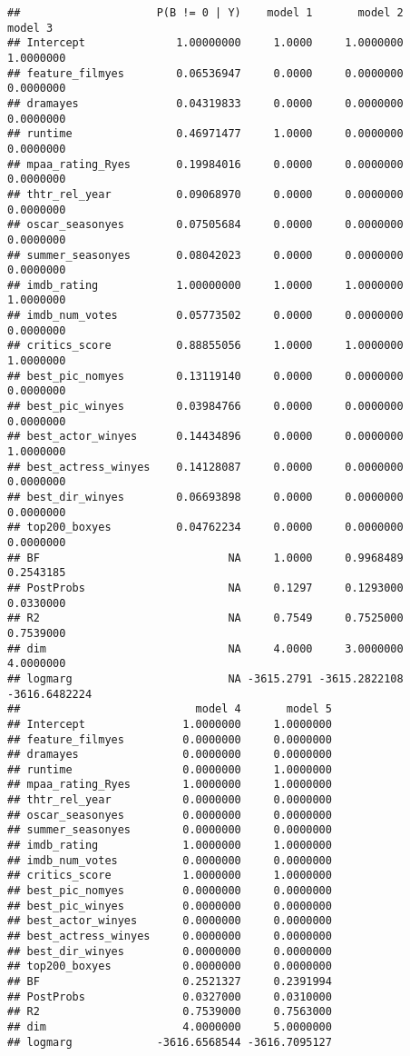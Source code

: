\documentclass[]{article}
\begin{document}
\begin{verbatim}
##                     P(B != 0 | Y)    model 1       model 2       model 3
## Intercept              1.00000000     1.0000     1.0000000     1.0000000
## feature_filmyes        0.06536947     0.0000     0.0000000     0.0000000
## dramayes               0.04319833     0.0000     0.0000000     0.0000000
## runtime                0.46971477     1.0000     0.0000000     0.0000000
## mpaa_rating_Ryes       0.19984016     0.0000     0.0000000     0.0000000
## thtr_rel_year          0.09068970     0.0000     0.0000000     0.0000000
## oscar_seasonyes        0.07505684     0.0000     0.0000000     0.0000000
## summer_seasonyes       0.08042023     0.0000     0.0000000     0.0000000
## imdb_rating            1.00000000     1.0000     1.0000000     1.0000000
## imdb_num_votes         0.05773502     0.0000     0.0000000     0.0000000
## critics_score          0.88855056     1.0000     1.0000000     1.0000000
## best_pic_nomyes        0.13119140     0.0000     0.0000000     0.0000000
## best_pic_winyes        0.03984766     0.0000     0.0000000     0.0000000
## best_actor_winyes      0.14434896     0.0000     0.0000000     1.0000000
## best_actress_winyes    0.14128087     0.0000     0.0000000     0.0000000
## best_dir_winyes        0.06693898     0.0000     0.0000000     0.0000000
## top200_boxyes          0.04762234     0.0000     0.0000000     0.0000000
## BF                             NA     1.0000     0.9968489     0.2543185
## PostProbs                      NA     0.1297     0.1293000     0.0330000
## R2                             NA     0.7549     0.7525000     0.7539000
## dim                            NA     4.0000     3.0000000     4.0000000
## logmarg                        NA -3615.2791 -3615.2822108 -3616.6482224
##                           model 4       model 5
## Intercept               1.0000000     1.0000000
## feature_filmyes         0.0000000     0.0000000
## dramayes                0.0000000     0.0000000
## runtime                 0.0000000     1.0000000
## mpaa_rating_Ryes        1.0000000     1.0000000
## thtr_rel_year           0.0000000     0.0000000
## oscar_seasonyes         0.0000000     0.0000000
## summer_seasonyes        0.0000000     0.0000000
## imdb_rating             1.0000000     1.0000000
## imdb_num_votes          0.0000000     0.0000000
## critics_score           1.0000000     1.0000000
## best_pic_nomyes         0.0000000     0.0000000
## best_pic_winyes         0.0000000     0.0000000
## best_actor_winyes       0.0000000     0.0000000
## best_actress_winyes     0.0000000     0.0000000
## best_dir_winyes         0.0000000     0.0000000
## top200_boxyes           0.0000000     0.0000000
## BF                      0.2521327     0.2391994
## PostProbs               0.0327000     0.0310000
## R2                      0.7539000     0.7563000
## dim                     4.0000000     5.0000000
## logmarg             -3616.6568544 -3616.7095127
\end{verbatim}
\end{document}
